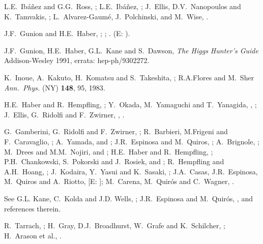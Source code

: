 \begin{thebibliography}{99}
L.E.~Ib\'a\~nez and G.G.~Ross, ;
L.E.~Ib\'a\~nez, ;
J.~Ellis, D.V.~Nanopoulos and K.~Tamvakis,
;
L.~Alvarez-Gaum\'e, J.~Polchinski, and M.~Wise,
.

 J.F.~Gunion and H.E.~Haber,
; ;
.
(E: ).

J.F.~Gunion, H.E.~Haber, G.L.~Kane and S.~Dawson,
{\em The Higgs Hunter's
Guide} Addison-Wesley 1991,
errata: hep-ph/9302272.

 K.~Inoue, A.~Kakuto, H.~Komatsu and
S.~Takeshita, ; R.A.Flores and
M.~Sher {\it Ann.~Phys.} (NY) {\bf 148}, 95, 1983.

H.E.~Haber and R.~Hempfling, ;
Y.~Okada, M.~Yamaguchi and T.~Yanagida,
, ; 
J.~Ellis, G.~Ridolfi and F.~Zwirner,
, .

G.~Gamberini, G.~Ridolfi and F.~Zwirner,
; 
R.~Barbieri, M.Frigeni and F.~Caravaglio, ;
A.~Yamada,  and
;
J.R.~Espinosa and M.~Quiros, ;
A.~Brignole, ;
M.~Drees and M.M.~Nojiri,  and
;
H.E.~Haber and R.~Hempfling, ;
P.H.~Chankowski, S.~Pokorski and J.~Rosiek,
 and ;
R.~Hempfling and A.H.~Hoang, ;
J.~Kodaira, Y.~Yasui and K.~Sasaki, ;
J.A.~Casas, J.R.~Espinosa, M.~Quiros and A.~Riotto,
 [E: ];
M.~Carena, M.~Quir\'os and C.~Wagner, .

 See G.L. Kane, C.~Kolda and J.D. Wells,
; J.R.~Espinosa and M.~Quir\'os,
,
 and references therein.

 R.~Tarrach, ;
H.~Gray, D.J.~Broadhurst, W.~Grafe and K.~Schilcher,
;
H.~Arason et al., .


\end{thebibliography}
